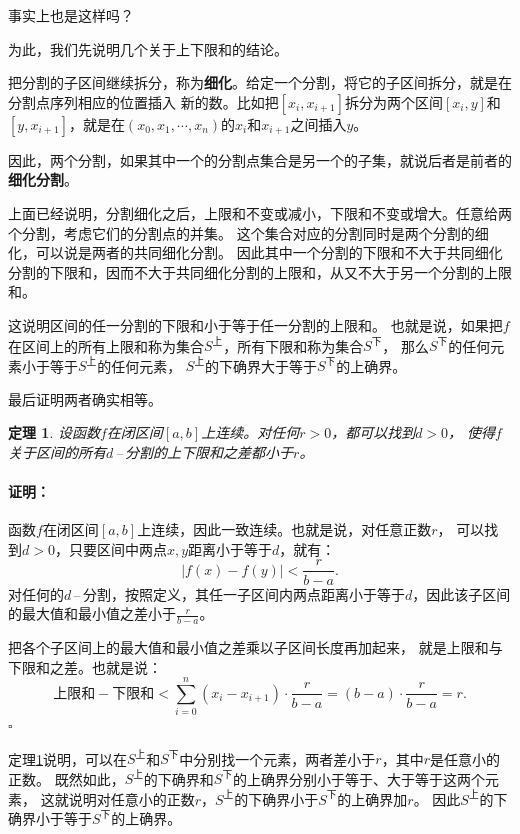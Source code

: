 \documentclass[12pt,UTF8]{ctexbook}
\renewenvironment{proof}{\paragraph{\textbf{证明：}}}{\hfill$\square$}
\newtheorem{tm}{定理}[section]
\begin{document}
\begin{appendix}
事实上也是这样吗？

为此，我们先说明几个关于上下限和的结论。

把分割的子区间继续拆分，称为\textbf{细化}。给定一个分割，将它的子区间拆分，就是在分割点序列相应的位置插入
新的数。比如把$[x_i, x_{i+1}]$拆分为两个区间$[x_i, y]$和$[y, x_{i+1}]$，就是在$(x_0, x_1, \cdots, x_n)$的$x_i$和$x_{i+1}$之间插入$y$。

因此，两个分割，如果其中一个的分割点集合是另一个的子集，就说后者是前者的\textbf{细化分割}。

上面已经说明，分割细化之后，上限和不变或减小，下限和不变或增大。任意给两个分割，考虑它们的分割点的并集。
这个集合对应的分割同时是两个分割的细化，可以说是两者的共同细化分割。
因此其中一个分割的下限和不大于共同细化分割的下限和，因而不大于共同细化分割的上限和，从又不大于另一个分割的上限和。

这说明区间的任一分割的下限和小于等于任一分割的上限和。
也就是说，如果把$f$在区间上的所有上限和称为集合$S^{\text{上}}$，所有下限和称为集合$S^{\text{下}}$，
那么$S^{\text{下}}$的任何元素小于等于$S^{\text{上}}$的任何元素，
$S^{\text{上}}$的下确界大于等于$S^{\text{下}}$的上确界。

最后证明两者确实相等。

\begin{tm}\label{tm:c-1-10}
    设函数$f$在闭区间$[a,b]$上连续。对任何$r>0$，都可以找到$d>0$，
    使得$f$关于区间的所有$d$\,–\,分割的上下限和之差都小于$r$。
\end{tm}

\begin{proof}
    函数$f$在闭区间$[a,b]$上连续，因此一致连续。也就是说，对任意正数$r$，
    可以找到$d>0$，只要区间中两点$x,y$距离小于等于$d$，就有：
    $$ |f(x) - f(y)| < \frac{r}{b - a}. $$
    对任何的$d$\,–\,分割，按照定义，其任一子区间内两点距离小于等于$d$，因此该子区间的最大值和最小值之差小于$\frac{r}{b - a}$。
    
    把各个子区间上的最大值和最小值之差乘以子区间长度再加起来，
    就是上限和与下限和之差。也就是说：
    $$ \mbox{上限和} - \mbox{下限和} < \sum_{i=0}^n (x_i - x_{i+1}) \cdot \frac{r}{b - a} = (b - a) \cdot \frac{r}{b - a} = r.$$
\end{proof}

定理\ref{tm:c-1-10}说明，可以在$S^{\text{上}}$和$S^{\text{下}}$中分别找一个元素，两者差小于$r$，其中$r$是任意小的正数。
既然如此，$S^{\text{上}}$的下确界和$S^{\text{下}}$的上确界分别小于等于、大于等于这两个元素，
这就说明对任意小的正数$r$，$S^{\text{上}}$的下确界小于$S^{\text{下}}$的上确界加$r$。
因此$S^{\text{上}}$的下确界小于等于$S^{\text{下}}$的上确界。


\end{appendix}
\end{document}
